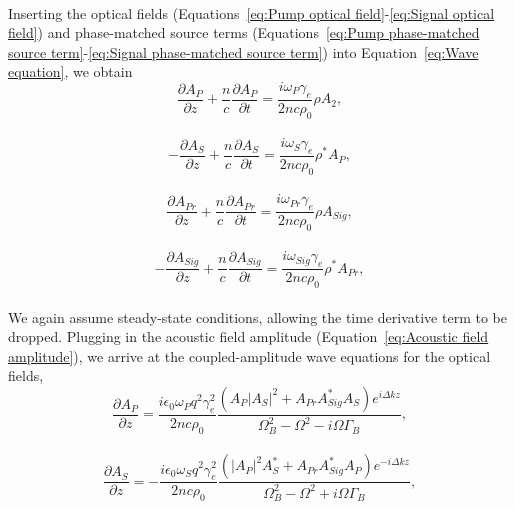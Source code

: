 \\
Inserting the optical fields (Equations~\ref{eq:Pump optical field}-\ref{eq:Signal optical field}) and phase-matched source terms (Equations~\ref{eq:Pump phase-matched source term}-\ref{eq:Signal phase-matched source term}) into Equation~\ref{eq:Wave equation}, we obtain
\\
\begin{equation}
    \frac{\partial A_{P}}{\partial z} + \frac{n}{c}\frac{\partial A_{P}}{\partial t} = \frac{i\omega_{P}\gamma_{e}}{2nc\rho_{0}}\rho A_{2},
\end{equation}
\\
\begin{equation}
    -\frac{\partial A_{S}}{\partial z} + \frac{n}{c}\frac{\partial A_{S}}{\partial t} = \frac{i\omega_{S}\gamma_{e}}{2nc\rho_{0}}\rho^{*}A_{P},
\end{equation}
\\
\begin{equation}
    \frac{\partial A_{Pr}}{\partial z} + \frac{n}{c}\frac{\partial A_{Pr}}{\partial t} = \frac{i\omega_{Pr}\gamma_{e}}{2nc\rho_{0}}\rho A_{Sig},
\end{equation}
\\
\begin{equation}
    -\frac{\partial A_{Sig}}{\partial z} + \frac{n}{c}\frac{\partial A_{Sig}}{\partial t} = \frac{i\omega_{Sig}\gamma_{e}}{2nc\rho_{0}}\rho^{*}A_{Pr},
\end{equation}
\\
We again assume steady-state conditions, allowing the time derivative term to be dropped. Plugging in the acoustic field amplitude (Equation~\ref{eq:Acoustic field amplitude}), we arrive at the coupled-amplitude wave equations for the optical fields,
\\
\begin{equation}
    \frac{\partial A_{P}}{\partial z} = \frac{i\epsilon_{0}\omega_{P} q^{2}\gamma_{e}^{2}}{2nc\rho_{0}}\frac{(A_{P}|A_{S}|^{2} + A_{Pr}A_{Sig}^{*}A_{S})e^{i\Delta kz}}{\Omega_{B}^{2} - \Omega^{2} - i\Omega\Gamma_{B}},
    \label{eq:Pump coupled-amplitude wave equation}
\end{equation}
\\
\begin{equation}
    \frac{\partial A_{S}}{\partial z} = -\frac{i\epsilon_{0}\omega_{S} q^{2}\gamma_{e}^{2}}{2nc\rho_{0}}\frac{(|A_{P}|^{2}A_{S}^{*} + A_{Pr}A_{Sig}^{*}A_{P})e^{-i\Delta kz}}{\Omega_{B}^{2} - \Omega^{2} + i\Omega\Gamma_{B}},
\end{equation}
